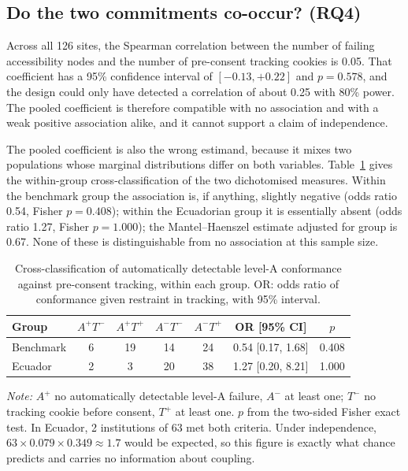 \documentclass[pdflatex,sn-basic,Numbered,iicol]{sn-jnl}
\theoremstyle{thmstyleone}
\theoremstyle{thmstyletwo}
\theoremstyle{thmstylethree}
\begin{document}
	\subsection{Do the two commitments co-occur? (RQ4)}\label{sec:results-joint}
	
	Across all 126 sites, the Spearman correlation between the number of failing accessibility nodes and the number of pre-consent tracking cookies is 0.05. That coefficient has a 95\% confidence interval of $[-0.13, +0.22]$ and $p=0.578$, and the design could only have detected a correlation of about 0.25 with 80\% power. The pooled coefficient is therefore compatible with no association and with a weak positive association alike, and it cannot support a claim of independence.
	
	The pooled coefficient is also the wrong estimand, because it mixes two populations whose marginal distributions differ on both variables. Table~\ref{tab:joint} gives the within-group cross-classification of the two dichotomised measures. Within the benchmark group the association is, if anything, slightly negative (odds ratio 0.54, Fisher $p=0.408$); within the Ecuadorian group it is essentially absent (odds ratio 1.27, Fisher $p=1.000$); the Mantel--Haenszel estimate adjusted for group is 0.67. None of these is distinguishable from no association at this sample size.
	
	\begin{table}[htbp]
		\centering
		\caption{Cross-classification of automatically detectable level-A conformance against pre-consent tracking, within each group. OR: odds ratio of conformance given restraint in tracking, with 95\% interval.}\label{tab:joint}
		\small
		\begin{tabular}{@{}lcccccc@{}}
			\toprule
			\textbf{Group} & $A^{+}T^{-}$ & $A^{+}T^{+}$ & $A^{-}T^{-}$ & $A^{-}T^{+}$ & \textbf{OR [95\% CI]} & \textbf{$p$} \\
			\midrule
			Benchmark & 6 & 19 & 14 & 24 & 0.54 [0.17, 1.68] & 0.408 \\
			Ecuador & 2 & 3 & 20 & 38 & 1.27 [0.20, 8.21] & 1.000 \\
			\bottomrule
		\end{tabular}
		\par\vspace{3pt}
		\footnotesize\RaggedRight\textit{Note:} $A^{+}$ no automatically detectable level-A failure, $A^{-}$ at least one; $T^{-}$ no tracking cookie before consent, $T^{+}$ at least one. $p$ from the two-sided Fisher exact test. In Ecuador, 2 institutions of 63 met both criteria. Under independence, $63 \times 0.079 \times 0.349 \approx 1.7$ would be expected, so this figure is exactly what chance predicts and carries no information about coupling.
	\end{table}
	
\end{document}
